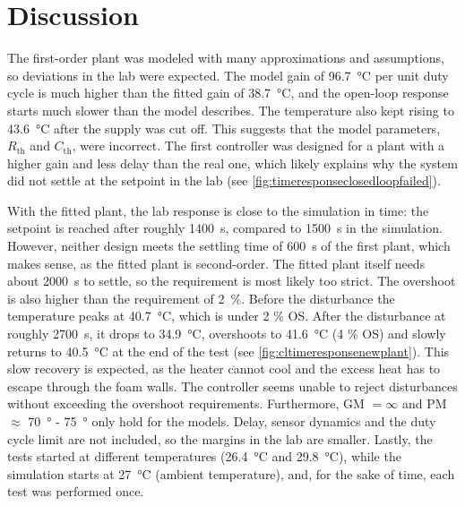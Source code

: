 \documentclass[10pt, a4paper, twocolumn]{article}
\newcommand{\upsub}[1]{_{\mathrm{#1}}}
\begin{document}
\section{Discussion}
The first-order plant was modeled with many approximations and assumptions, so deviations in the lab were expected. The model gain of \qty{96.7}{\degreeCelsius} per unit duty cycle is much higher than the fitted gain of \qty{38.7}{\degreeCelsius}, and the open-loop response starts much slower than the model describes. The temperature also kept rising to \qty{43.6}{\degreeCelsius} after the supply was cut off. This suggests that the model parameters, $R\upsub{th}$ and $C\upsub{th}$, were incorrect. The first controller was designed for a plant with a higher gain and less delay than the real one, which likely explains why the system did not settle at the setpoint in the lab (see \cref{fig:timeresponseclosedloopfailed}). 

With the fitted plant, the lab response is close to the simulation in time: the setpoint is reached after roughly \qty{1400}{\second}, compared to \qty{1500}{\second} in the simulation. However, neither design meets the settling time of \qty{600}{\second} of the first plant, which makes sense, as the fitted plant is second-order. The fitted plant itself needs about \qty{2000}{\second} to settle, so the requirement is most likely too strict. The overshoot is also higher than the requirement of \qty{2}{\percent}. Before the disturbance the temperature peaks at \qty{40.7}{\degreeCelsius}, which is under 2 \% OS. After the disturbance at roughly \qty{2700}{\second}, it drops to \qty{34.9}{\degreeCelsius}, overshoots to \qty{41.6}{\degreeCelsius} (4 \% OS) and slowly returns to \qty{40.5}{\degreeCelsius} at the end of the test (see \cref{fig:cltimeresponsenewplant}). This slow recovery is expected, as the heater cannot cool and the excess heat has to escape through the foam walls. The controller seems unable to reject disturbances without exceeding the overshoot requirements. Furthermore, GM $=\infty$ and PM $\approx$ \qty{70}{\degree} - \qty{75}{\degree} only hold for the models. Delay, sensor dynamics and the duty cycle limit are not included, so the margins in the lab are smaller. Lastly, the tests started at different temperatures (\qty{26.4}{\degreeCelsius} and \qty{29.8}{\degreeCelsius}), while the simulation starts at \qty{27}{\degreeCelsius} (ambient temperature), and, for the sake of time, each test was performed once.
\end{document}
